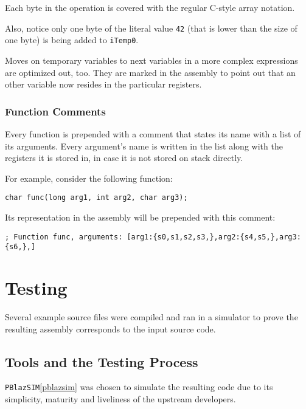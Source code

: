             Each byte in the operation is covered with the regular C-style array notation.

            Also, notice only one byte of the literal value \texttt{42} (that is lower than the size of one byte) is being added to \texttt{iTemp0}. 

            Moves on temporary variables to next variables in a more complex expressions are optimized out, too. They are marked in the assembly to point out that an other variable now resides in the particular registers.

            \subsubsection{Function Comments}

            Every function is prepended with a comment that states its name with a list of its arguments. Every argument's name is written in the list along with the registers it is stored in, in case it is not stored on stack directly.

            For example, consider the following function:

            \begin{center}\texttt{char func(long arg1, int arg2, char arg3);}\end{center}

            Its representation in the assembly will be prepended with this comment:

            \begin{center}\texttt{; Function func, arguments: [arg1:\{s0,s1,s2,s3,\},arg2:\{s4,s5,\},arg3:\{s6,\},]}\end{center}

            

    \section{Testing}

    Several example source files were compiled and ran in a simulator to prove the resulting assembly corresponds to the input source code.

        \subsection{Tools and the Testing Process}

        \texttt{PBlazSIM}\ref{pblazsim} was chosen to simulate the resulting code due to its simplicity, maturity and liveliness of the upstream developers. 


